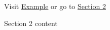 Visit \href{https://example.com}{Example} or go to \hyperlink{section2}{Section 2}

\hypertarget{section2}{}Section 2 content

